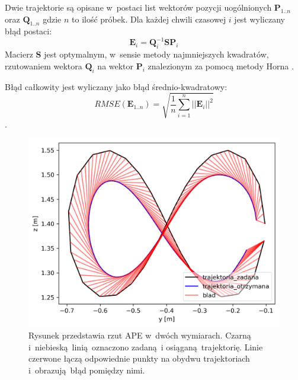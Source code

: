 Dwie trajektorie są opisane w~postaci list wektorów pozycji uogólnionych $\boldsymbol{P}_{1..n}$ oraz $\boldsymbol{Q}_{1..n}$ gdzie $n$ to ilość próbek. Dla każdej chwili czasowej $i$ jest wyliczany błąd postaci:
\begin{equation}
\boldsymbol{E}_i = \boldsymbol{Q}_i^{-1}\boldsymbol{S}\boldsymbol{P}_i
\end{equation}
Macierz $\boldsymbol{S}$ jest optymalnym, w~sensie metody najmniejszych kwadratów, rzutowaniem wektora $\boldsymbol{Q}_i$ na wektor $\boldsymbol{P}_i$ znalezionym za pomocą metody Horna \cite{bib:horn}. 

Błąd całkowity jest wyliczany jako błąd średnio-kwadratowy:
\begin{equation}
RMSE(\boldsymbol{E}_{1..n}) = \sqrt{\frac{1}{n}\sum_{i=1}^{n}||\boldsymbol{E}_i||^2}
\end{equation}.



\begin{figure}
	\centering
		\includegraphics[width=.45\textwidth]{./velma/przerobione_testy/out/osemka/yz_ate_plot_podnoszenie_miekki_bez_brak.png}
		\caption{Rysunek przedstawia rzut APE w~dwóch wymiarach. Czarną i~niebieską linią oznaczono zadaną i osiąganą trajektorię. Linie czerwone łączą odpowiednie punkty na obydwu trajektoriach i~obrazują błąd pomiędzy nimi.}
		\label{fig:przykl_ape}
\end{figure}




